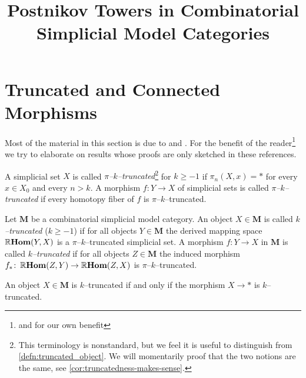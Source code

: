 




\title{Postnikov Towers in Combinatorial Simplicial Model Categories}
\date{}
\maketitle

{\footnotesize
\tableofcontents
}

\section{Truncated and Connected Morphisms}
Most of the material in this section is due to \cite{mr2522659} and \cite{rezkhomotopytoposes}. For the benefit of the reader\footnote{and for our own benefit} we try to elaborate on results whose proofs are only sketched in these references.

\begin{definition}\label{defn:truncated_simp}
  A simplicial set \(X\) is called \emph{\(\pi\)--\(k\)--truncated}\footnote{This terminology is nonstandard, but we feel it is useful to distinguish from \autoref{defn:truncated_object}. We will momentarily proof that the two notions are the same, see \autoref{cor:truncatedness-makes-sense}.} for \(k\geq -1\) if \(\pi_{n}(X,x) = *\) for every \(x\in X_{0}\) and every \(n>k\). A morphism \(f\colon Y\to X\) of simplicial sets is called \emph{\(\pi\)--\(k\)--truncated} if every homotopy fiber of \(f\) is \(\pi\)--\(k\)--truncated.
\end{definition}

\begin{definition}\label{defn:truncated_object}
  Let \(\mathbf{M}\) be a combinatorial simplicial model category. An object \(X\in\mathbf{M}\) is called \emph{\(k\)--truncated} (\(k\geq -1\)) if for all objects \(Y\in\mathbf{M}\) the derived mapping space \(\operatorname{\mathbb{R}\textnormal{\bfseries Hom}}(Y,X)\) is a \(\pi\)--\(k\)--truncated simplicial set. A morphism \(f\colon Y\to X\) in \(\mathbf{M}\) is called \emph{\(k\)--truncated} if for all objects \(Z\in\mathbf{M}\) the induced morphism \(f_{*}\colon \operatorname{\mathbb{R}\textnormal{\bfseries Hom}}(Z,Y)\to\operatorname{\mathbb{R}\textnormal{\bfseries Hom}}(Z,X)\) is \(\pi\)--\(k\)--truncated.
\end{definition}

\begin{remark}
  An object \(X\in\mathbf M\) is \(k\)--truncated if and only if the morphism \(X\to *\) is \(k\)--truncated.
\end{remark}

